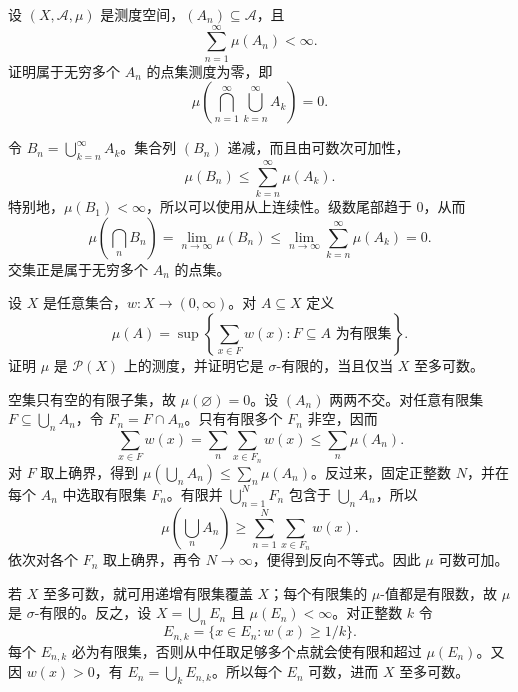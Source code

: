 \begin{exercise}
\label{b1:ex:0202}
设 \((X,\mathcal A,\mu)\) 是测度空间，\((A_n)\subseteq\mathcal A\)，且
\[
\sum_{n=1}^{\infty}\mu(A_n)<\infty.
\]
证明属于无穷多个 \(A_n\) 的点集测度为零，即
\[
\mu\left(\bigcap_{n=1}^{\infty}\bigcup_{k=n}^{\infty}A_k\right)=0.
\]
\end{exercise}
\begin{solution}
令 \(B_n=\bigcup_{k=n}^{\infty}A_k\)。集合列 \((B_n)\) 递减，而且由可数次可加性，
\[
\mu(B_n)\leq\sum_{k=n}^{\infty}\mu(A_k).
\]
特别地，\(\mu(B_1)<\infty\)，所以可以使用从上连续性。级数尾部趋于 \(0\)，从而
\[
\mu\left(\bigcap_nB_n\right)
=\lim_{n\to\infty}\mu(B_n)
\leq\lim_{n\to\infty}\sum_{k=n}^{\infty}\mu(A_k)=0.
\]
交集正是属于无穷多个 \(A_n\) 的点集。
\end{solution}

\begin{exercise}
\label{b1:ex:0203}
设 \(X\) 是任意集合，\(w:X\to(0,\infty)\)。对 \(A\subseteq X\) 定义
\[
\mu(A)=\sup\left\{\sum_{x\in F}w(x):F\subseteq A\text{ 为有限集}\right\}.
\]
证明 \(\mu\) 是 \(\mathcal P(X)\) 上的测度，并证明它是 \(\sigma\)-有限的，当且仅当 \(X\) 至多可数。
\end{exercise}
\begin{solution}
空集只有空的有限子集，故 \(\mu(\varnothing)=0\)。设 \((A_n)\) 两两不交。对任意有限集
\(F\subseteq\bigcup_nA_n\)，令 \(F_n=F\cap A_n\)。只有有限多个 \(F_n\) 非空，因而
\[
\sum_{x\in F}w(x)
=\sum_n\sum_{x\in F_n}w(x)
\leq\sum_n\mu(A_n).
\]
对 \(F\) 取上确界，得到 \(\mu(\bigcup_nA_n)\leq\sum_n\mu(A_n)\)。反过来，固定正整数 \(N\)，并在每个 \(A_n\) 中选取有限集 \(F_n\)。有限并 \(\bigcup_{n=1}^{N}F_n\) 包含于 \(\bigcup_nA_n\)，所以
\[
\mu\left(\bigcup_nA_n\right)
\geq\sum_{n=1}^{N}\sum_{x\in F_n}w(x).
\]
依次对各个 \(F_n\) 取上确界，再令 \(N\to\infty\)，便得到反向不等式。因此 \(\mu\) 可数可加。

若 \(X\) 至多可数，就可用递增有限集覆盖 \(X\)；每个有限集的 \(\mu\)-值都是有限数，故 \(\mu\) 是 \(\sigma\)-有限的。反之，设 \(X=\bigcup_nE_n\) 且 \(\mu(E_n)<\infty\)。对正整数 \(k\) 令
\[
E_{n,k}=\{x\in E_n:w(x)\geq 1/k\}.
\]
每个 \(E_{n,k}\) 必为有限集，否则从中任取足够多个点就会使有限和超过 \(\mu(E_n)\)。又因 \(w(x)>0\)，有 \(E_n=\bigcup_kE_{n,k}\)。所以每个 \(E_n\) 可数，进而 \(X\) 至多可数。
\end{solution}

